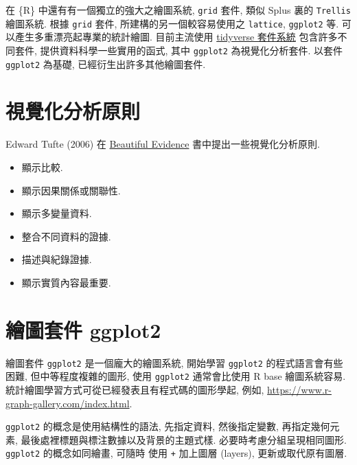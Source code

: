 \documentclass[
]{book}
\providecommand{\tightlist}{%
  \setlength{\itemsep}{0pt}\setlength{\parskip}{0pt}}
\begin{document}
在 \{R\} 中還有有一個獨立的強大之繪圖系統,
\texttt{grid}
套件,
類似
Splus
裏的
\texttt{Trellis}
繪圖系統.
根據 \texttt{grid}
套件,
所建構的另一個較容易使用之
\texttt{lattice},
\texttt{ggplot2} 等.
可以產生多重漂亮起專業的統計繪圖.
目前主流使用
\href{https://www.tidyverse.org/}{tidyverse 套件系統}
包含許多不同套件,
提供資料科學一些實用的函式,
其中 \texttt{ggplot2} 為視覺化分析套件.
以套件 \texttt{ggplot2} 為基礎, 已經衍生出許多其他繪圖套件.

\hypertarget{ux8996ux89baux5316ux5206ux6790ux539fux5247}{%
\section{視覺化分析原則}\label{ux8996ux89baux5316ux5206ux6790ux539fux5247}}

Edward Tufte (2006) 在 \href{http://www.edwardtufte.com}{Beautiful Evidence}
書中提出一些視覺化分析原則.

\begin{itemize}
\tightlist
\item
  顯示比較.
\item
  顯示因果關係或關聯性.
\item
  顯示多變量資料.
\item
  整合不同資料的證據.
\item
  描述與紀錄證據.
\item
  顯示實質內容最重要.
\end{itemize}

\hypertarget{ux7e6aux5716ux5957ux4ef6-ggplot2}{%
\section{繪圖套件 ggplot2}\label{ux7e6aux5716ux5957ux4ef6-ggplot2}}

繪圖套件 \texttt{ggplot2} 是一個龐大的繪圖系統,
開始學習 \texttt{ggplot2} 的程式語言會有些困難,
但中等程度複雜的圖形, 使用 \texttt{ggplot2} 通常會比使用 R base 繪圖系統容易.
統計繪圖學習方式可從已經發表且有程式碼的圖形學起,
例如, \url{https://www.r-graph-gallery.com/index.html}.

\texttt{ggplot2} 的概念是使用結構性的語法,
先指定資料, 然後指定變數, 再指定幾何元素,
最後處裡標題與標注數據以及背景的主題式樣.
必要時考慮分組呈現相同圖形.
\texttt{ggplot2} 的概念如同繪畫, 可隨時
使用 \texttt{+} 加上圖層 (layers),
更新或取代原有圖層.
\end{document}
